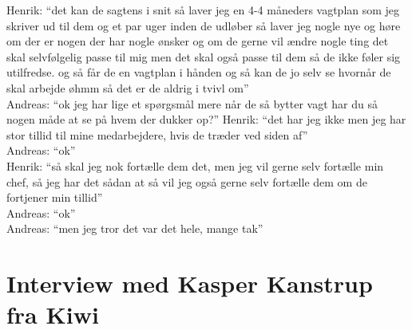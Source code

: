 Henrik: “det kan de sagtens i snit så laver jeg en 4-4 måneders vagtplan som jeg skriver ud til dem og et par uger inden de udløber så laver jeg nogle nye og høre om der er nogen der har nogle ønsker og om de gerne vil ændre nogle ting det skal selvfølgelig passe til mig men det skal også passe til dem så de ikke føler sig utilfredse. og så får de en vagtplan i hånden og så kan de jo selv se hvornår de skal arbejde øhmm så det er de aldrig i tvivl om”\\
Andreas: “ok jeg har lige et spørgsmål mere når de så bytter vagt har du så nogen måde at se på hvem der dukker op?”
Henrik: “det har jeg ikke men jeg har stor tillid til mine medarbejdere, hvis de træder ved siden af”\\
Andreas: “ok”\\
Henrik: “så skal jeg nok fortælle dem det, men jeg vil gerne selv fortælle min chef, så jeg har det sådan at så vil jeg også gerne selv fortælle dem om de fortjener min tillid”\\
Andreas: “ok”\\
Andreas: “men jeg tror det var det hele, mange tak”\\


\section{Interview med Kasper Kanstrup fra Kiwi}\label{app:kiwi}

